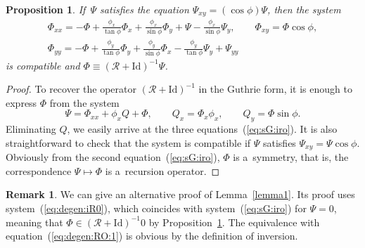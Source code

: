 \documentclass[pdftex]{sigma}
\def\eqref#1{{\rm(\ref{#1})}}
\def\RO{{\mathcal R}}
\numberwithin{equation}{section}
\newtheorem{Proposition}[Theorem]{Proposition}
\theoremstyle{definition}
\newtheorem{Remark}[Theorem]{Remark}
\begin{document}
\begin{Proposition}
\label{prop:sG.iro}
If~$\Psi$ satisfies the equation $\Psi_{xy} = (\cos\phi)\Psi$,
then the system
\begin{gather}
\Phi_{xx} = -\Phi
 + \frac{\phi_x}{\tan\phi} \Phi_x
 + \frac{\phi_x}{\sin\phi} \Phi_y
 + \Psi
 - \frac{\phi_x}{\sin\phi} \Psi_y,
\qquad
\Phi_{xy} = \Phi \cos\phi,
\nonumber
\\
\Phi_{yy} = -\Phi
 + \frac{\phi_y}{\tan\phi} \Phi_y
 + \frac{\phi_y}{\sin\phi} \Phi_x
 - \frac{\phi_y}{\tan\phi} \Psi_y
 + \Psi_{yy}
\label{eq:sG:iro}
\end{gather}
is compatible and
$\Phi \equiv (\RO + \mathrm{Id})^{-1} \Psi$.
\end{Proposition}

\begin{proof}
To recover the operator $(\RO + \mathrm{Id})^{-1}$ in the Guthrie form,
it is enough to express $\Phi$ from the system
\[
\Psi = \Phi_{xx} + \phi_x Q + \Phi,
\qquad
Q_x = \Phi_x \phi_x,
\qquad
Q_y = \Phi \sin \phi.
\]
Eliminating $Q$, we easily arrive at the three
equations~\eqref{eq:sG:iro}.
It is also straightforward to check that the system is compatible
if $\Psi$ satisfies $\Psi_{xy} = \Psi \cos\phi$.
Obviously from the second equation~\eqref{eq:sG:iro},
$\Phi$ is a~symmetry, that is,
the correspondence $\Psi \mapsto \Phi$ is a~recursion operator.
\end{proof}

\begin{Remark}
We can give an alternative proof of Lemma~\ref{lemma1}.
Its proof uses system~\eqref{eq:degen:iR0}, which
coincides with system~\eqref{eq:sG:iro} for $\Psi = 0$,
meaning that
$
\Phi \in (\RO + \mathrm{Id})^{-1} 0
$
by Proposition~\ref{prop:sG.iro}.
The equivalence with equation~\eqref{eq:degen:RO:1} is obvious
by the definition of inversion.
\end{Remark}
\end{document}
